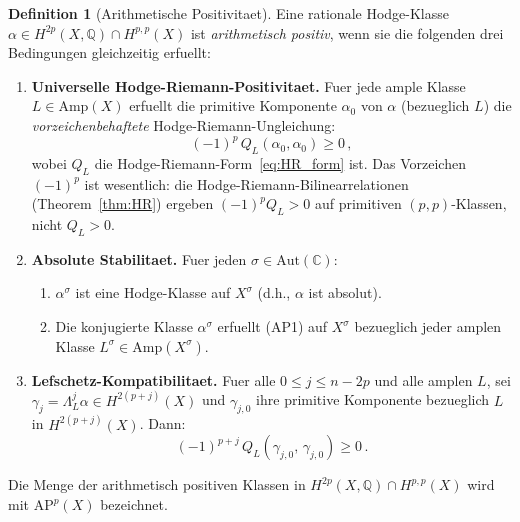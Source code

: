 \documentclass[aps,prd,twocolumn,superscriptaddress,nofootinbib]{revtex4-2}
\theoremstyle{definition}
\newtheorem{definition}[theorem]{Definition}
\theoremstyle{remark}
\begin{document}
\begin{definition}[Arithmetische Positivitaet]
\label{def:arith_pos}
Eine rationale Hodge-Klasse $\alpha \in H^{2p}(X, \mathbb{Q}) \cap H^{p,p}(X)$ ist \textit{arithmetisch positiv}, wenn sie die folgenden drei Bedingungen gleichzeitig erfuellt:

\begin{enumerate}
\item[\textbf{(AP1)}] \textbf{Universelle Hodge-Riemann-Positivitaet.} Fuer jede ample Klasse $L \in \mathrm{Amp}(X)$ erfuellt die primitive Komponente $\alpha_0$ von $\alpha$ (bezueglich $L$) die \textit{vorzeichenbehaftete} Hodge-Riemann-Ungleichung:
\begin{equation}
(-1)^p\, Q_L(\alpha_0, \alpha_0) \geq 0\,,
\label{eq:AP1}
\end{equation}
wobei $Q_L$ die Hodge-Riemann-Form~\eqref{eq:HR_form} ist. Das Vorzeichen $(-1)^p$ ist wesentlich: die Hodge-Riemann-Bilinearrelationen (Theorem~\ref{thm:HR}) ergeben $(-1)^p Q_L > 0$ auf primitiven $(p,p)$-Klassen, nicht $Q_L > 0$.

\item[\textbf{(AP2)}] \textbf{Absolute Stabilitaet.} Fuer jeden $\sigma \in \mathrm{Aut}(\mathbb{C})$:
\begin{enumerate}
\item[(a)] $\alpha^\sigma$ ist eine Hodge-Klasse auf $X^\sigma$ (d.h., $\alpha$ ist absolut).
\item[(b)] Die konjugierte Klasse $\alpha^\sigma$ erfuellt (AP1) auf $X^\sigma$ bezueglich jeder amplen Klasse $L^\sigma \in \mathrm{Amp}(X^\sigma)$.
\end{enumerate}

\item[\textbf{(AP3)}] \textbf{Lefschetz-Kompatibilitaet.} Fuer alle $0 \leq j \leq n - 2p$ und alle amplen $L$, sei $\gamma_j = \Lambda_L^j \alpha \in H^{2(p+j)}(X)$ und $\gamma_{j,0}$ ihre primitive Komponente bezueglich $L$ in $H^{2(p+j)}(X)$. Dann:
\begin{equation}
(-1)^{p+j}\, Q_{L}(\gamma_{j,0},\, \gamma_{j,0}) \geq 0\,.
\label{eq:AP3}
\end{equation}
\end{enumerate}

Die Menge der arithmetisch positiven Klassen in $H^{2p}(X, \mathbb{Q}) \cap H^{p,p}(X)$ wird mit $\mathrm{AP}^p(X)$ bezeichnet.
\end{definition}
\end{document}
